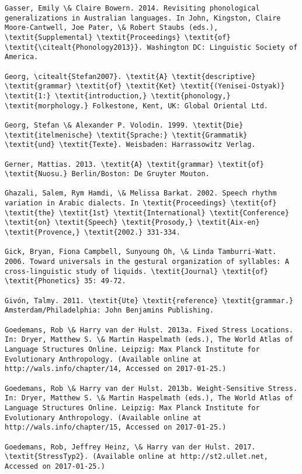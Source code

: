 \begin{verbatim}
Gasser, Emily \& Claire Bowern. 2014. Revisiting phonological generalizations in Australian languages. In John, Kingston, Claire Moore-Cantwell, Joe Pater, \& Robert Staubs (eds.), \textit{Supplemental} \textit{Proceedings} \textit{of} \textit{\citealt{Phonology2013}}. Washington DC: Linguistic Society of America.

Georg, \citealt{Stefan2007}. \textit{A} \textit{descriptive} \textit{grammar} \textit{of} \textit{Ket} \textit{(Yenisei-Ostyak)} \textit{1:} \textit{introduction,} \textit{phonology,} \textit{morphology.} Folkestone, Kent, UK: Global Oriental Ltd.

Georg, Stefan \& Alexander P. Volodin. 1999. \textit{Die} \textit{itelmenische} \textit{Sprache:} \textit{Grammatik} \textit{und} \textit{Texte}. Weisbaden: Harrassowitz Verlag.

Gerner, Mattias. 2013. \textit{A} \textit{grammar} \textit{of} \textit{Nuosu.} Berlin/Boston: De Gruyter Mouton.

Ghazali, Salem, Rym Hamdi, \& Melissa Barkat. 2002. Speech rhythm variation in Arabic dialects. In \textit{Proceedings} \textit{of} \textit{the} \textit{1st} \textit{International} \textit{Conference} \textit{on} \textit{Speech} \textit{Prosody,} \textit{Aix-en} \textit{Provence,} \textit{2002.} 331-334.

Gick, Bryan, Fiona Campbell, Sunyoung Oh, \& Linda Tamburri-Watt. 2006. Toward universals in the gestural organization of syllables: A cross-linguistic study of liquids. \textit{Journal} \textit{of} \textit{Phonetics} 35: 49-72.

Givón, Talmy. 2011. \textit{Ute} \textit{reference} \textit{grammar.} Amsterdam/Philadelphia: John Benjamins Publishing.

Goedemans, Rob \& Harry van der Hulst. 2013a. Fixed Stress Locations. In: Dryer, Matthew S. \& Martin Haspelmath (eds.), The World Atlas of Language Structures Online. Leipzig: Max Planck Institute for Evolutionary Anthropology. (Available online at http://wals.info/chapter/14, Accessed on 2017-01-25.)

Goedemans, Rob \& Harry van der Hulst. 2013b. Weight-Sensitive Stress. In: Dryer, Matthew S. \& Martin Haspelmath (eds.), The World Atlas of Language Structures Online. Leipzig: Max Planck Institute for Evolutionary Anthropology. (Available online at http://wals.info/chapter/15, Accessed on 2017-01-25.)

Goedemans, Rob, Jeffrey Heinz, \& Harry van der Hulst. 2017. \textit{StressTyp2}. (Available online at http://st2.ullet.net, Accessed on 2017-01-25.)


\end{verbatim}
